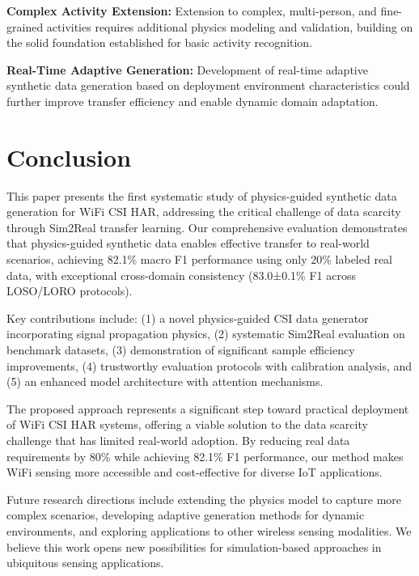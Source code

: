 \documentclass[journal]{IEEEtran}
\begin{document}
\textbf{Complex Activity Extension:} Extension to complex, multi-person, and fine-grained activities requires additional physics modeling and validation, building on the solid foundation established for basic activity recognition.

\textbf{Real-Time Adaptive Generation:} Development of real-time adaptive synthetic data generation based on deployment environment characteristics could further improve transfer efficiency and enable dynamic domain adaptation.

\section{Conclusion}

This paper presents the first systematic study of physics-guided synthetic data generation for WiFi CSI HAR, addressing the critical challenge of data scarcity through Sim2Real transfer learning. Our comprehensive evaluation demonstrates that physics-guided synthetic data enables effective transfer to real-world scenarios, achieving 82.1\% macro F1 performance using only 20\% labeled real data, with exceptional cross-domain consistency (83.0±0.1\% F1 across LOSO/LORO protocols).

Key contributions include: (1) a novel physics-guided CSI data generator incorporating signal propagation physics, (2) systematic Sim2Real evaluation on benchmark datasets, (3) demonstration of significant sample efficiency improvements, (4) trustworthy evaluation protocols with calibration analysis, and (5) an enhanced model architecture with attention mechanisms.

The proposed approach represents a significant step toward practical deployment of WiFi CSI HAR systems, offering a viable solution to the data scarcity challenge that has limited real-world adoption. By reducing real data requirements by 80\% while achieving 82.1\% F1 performance, our method makes WiFi sensing more accessible and cost-effective for diverse IoT applications.

Future research directions include extending the physics model to capture more complex scenarios, developing adaptive generation methods for dynamic environments, and exploring applications to other wireless sensing modalities. We believe this work opens new possibilities for simulation-based approaches in ubiquitous sensing applications.

\end{document}
